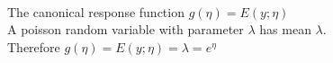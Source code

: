 \begin{answer}\\
The canonical response function $g(\eta)=E(y;\eta)$\\
A poisson random variable with parameter $\lambda$ has mean $\lambda$.\\
Therefore $g(\eta)=E(y;\eta)=\lambda=e^{\eta}$\\
\end{answer}

